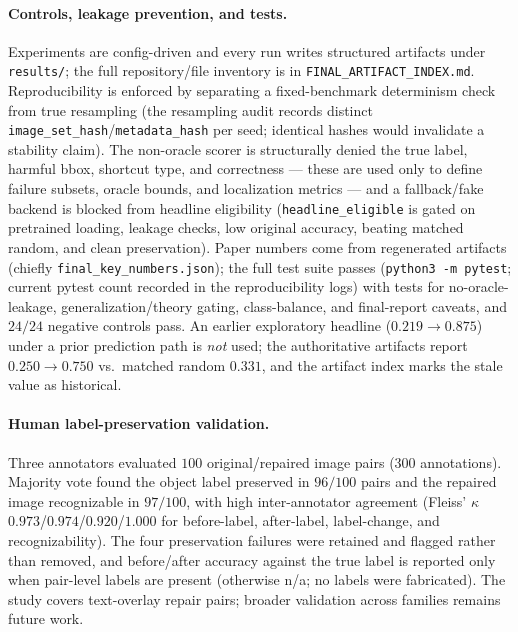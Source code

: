 \documentclass[11pt]{article}
\begin{document}
\paragraph{Controls, leakage prevention, and tests.}
Experiments are config-driven and every run writes structured artifacts under
\texttt{results/}; the full repository/file inventory is in
\texttt{FINAL\_ARTIFACT\_INDEX.md}. Reproducibility is enforced by separating a
fixed-benchmark determinism check from true resampling (the resampling audit records
distinct \texttt{image\_set\_hash}/\texttt{metadata\_hash} per seed; identical hashes
would invalidate a stability claim). The non-oracle scorer is structurally denied the
true label, harmful bbox, shortcut type, and correctness --- these are used only to
define failure subsets, oracle bounds, and localization metrics --- and a fallback/fake
backend is blocked from headline eligibility (\texttt{headline\_eligible} is gated on
pretrained loading, leakage checks, low original accuracy, beating matched random, and
clean preservation). Paper numbers come from regenerated artifacts (chiefly
\texttt{final\_key\_numbers.json}); the full test suite passes
(\texttt{python3 -m pytest}; current pytest count recorded in the reproducibility logs)
with tests for no-oracle-leakage, generalization/theory
gating, class-balance, and final-report caveats, and $24/24$ negative controls pass. An
earlier exploratory headline ($0.219\to0.875$) under a prior prediction path is
\emph{not} used; the authoritative artifacts report $0.250\to0.750$ vs.\ matched random
$0.331$, and the artifact index marks the stale value as historical.

\paragraph{Human label-preservation validation.}
Three annotators evaluated $100$ original/repaired image pairs ($300$ annotations).
Majority vote found the object label preserved in $96/100$ pairs and the repaired image
recognizable in $97/100$, with high inter-annotator agreement (Fleiss' $\kappa$
$0.973$/$0.974$/$0.920$/$1.000$ for before-label, after-label, label-change, and
recognizability). The four preservation failures were retained and flagged rather than
removed, and before/after accuracy against the true label is reported only when
pair-level labels are present (otherwise n/a; no labels were fabricated). The study
covers text-overlay repair pairs; broader validation across families remains future
work.
\end{document}
